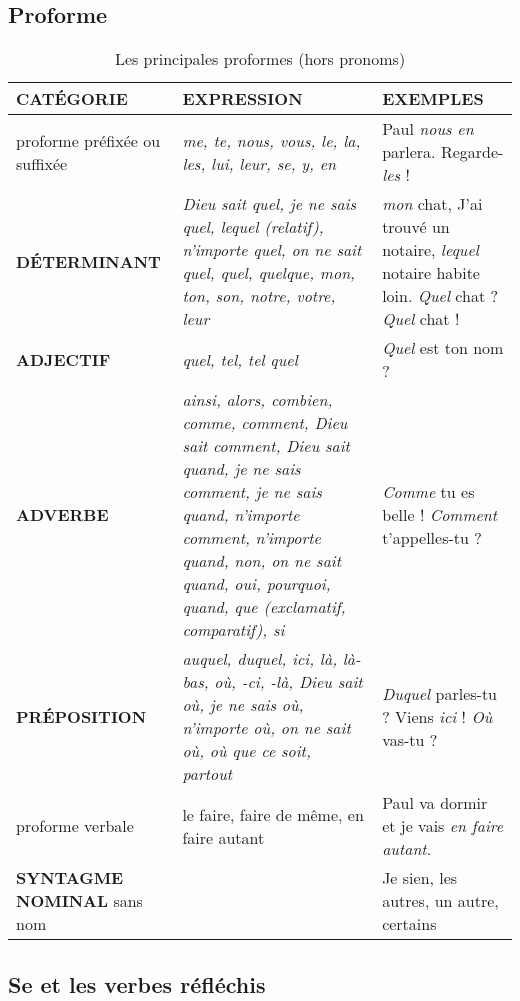 \documentclass[UTF8]{report}
\begin{document}
\subsection{Proforme}
\begin{table}[H]
\small
\centering
\begin{tabular}{|p{3cm}|p{5cm}|p{5cm}|}
\hline
\rowcolor{cyan!20}
\textbf{CATÉGORIE} & \textbf{EXPRESSION} & \textbf{EXEMPLES} \\ \hline
proforme préfixée ou suffixée & \textit{me, te, nous, vous, le, la, les, lui, leur, se, y, en} & Paul \textit{nous en} parlera. Regarde-\textit{les} ! \\ \hline
\textbf{DÉTERMINANT} & \textit{Dieu sait quel, je ne sais quel, lequel (relatif), n'importe quel, on ne sait quel, quel, quelque, mon, ton, son, notre, votre, leur} & \textit{mon} chat, J'ai trouvé un notaire, \textit{lequel} notaire habite loin. \textit{Quel} chat ? \textit{Quel} chat ! \\ \hline
\textbf{ADJECTIF} & \textit{quel, tel, tel quel} & \textit{Quel} est ton nom ? \\ \hline
\textbf{ADVERBE} & \textit{ainsi, alors, combien, comme, comment, Dieu sait comment, Dieu sait quand, je ne sais comment, je ne sais quand, n'importe comment, n'importe quand, non, on ne sait quand, oui, pourquoi, quand, que (exclamatif, comparatif), si} & \textit{Comme} tu es belle ! \textit{Comment} t'appelles-tu ? \\ \hline
\textbf{PRÉPOSITION} & \textit{auquel, duquel, ici, là, là-bas, où, -ci, -là, Dieu sait où, je ne sais où, n'importe où, on ne sait où, où que ce soit, partout} & \textit{Duquel} parles-tu ? Viens \textit{ici} ! \textit{Où} vas-tu ? \\ \hline
proforme verbale & le faire, faire de même, en faire autant & Paul va dormir et je vais \textit{en faire autant}.  \\ \hline
\textbf{SYNTAGME NOMINAL} sans nom & & Je sien, les autres, un autre, certains \\ \hline
\end{tabular}
\label{tab:grammatical}
\caption{Les principales proformes (hors pronoms)}
\end{table}

\subsection{Se et les verbes réfléchis}
\end{document}
